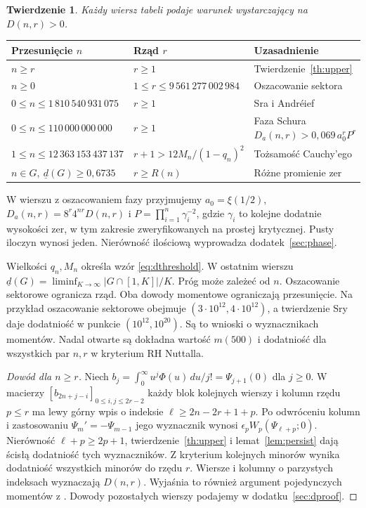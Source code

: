 \documentclass[11pt,a4paper,reqno]{amsart}
\newtheorem{theorem}{Twierdzenie}[section]
\numberwithin{equation}{section}
\begin{document}
\begin{theorem}\label{th:regions}
Każdy wiersz tabeli podaje warunek wystarczający na \(D(n,r)>0\).
\end{theorem}
\begin{center}\small
\begin{tabular}{@{}lll@{}}
\toprule
Przesunięcie \(n\) & Rząd \(r\) & Uzasadnienie\\
\midrule
\(n\ge r\) & \(r\ge1\) & Twierdzenie~\ref{th:upper}\\
\(n\ge0\) & \(1\le r\le9\,561\,277\,002\,984\) & Oszacowanie sektora\\
\(0\le n\le1\,810\,540\,931\,075\) & \(r\ge1\) & Sra i Andréief\\
\(0\le n\le110\,000\,000\,000\) & \(r\ge1\) & \shortstack[l]{Faza Schura\\[2pt]\(D_a(n,r)>0{,}069\,a_0^rP^r\)}\\
\(1\le n\le12\,363\,153\,437\,137\) & \(r+1>12M_n/(1-q_n)^2\) & Tożsamość Cauchy'ego\\
\(n\in G,\ \underline d(G)\ge0{,}6735\) & \(r\ge R(n)\) & Różne promienie zer\\
\bottomrule
\end{tabular}
\end{center}
W wierszu z oszacowaniem fazy przyjmujemy \(a_0=\xi(1/2)\), \(D_a(n,r)=8^r4^{nr}D(n,r)\) i \(P=\prod_{i=1}^n\gamma_i^{-2}\), gdzie \(\gamma_i\) to kolejne dodatnie wysokości zer, w tym zakresie zweryfikowanych na prostej krytycznej. Pusty iloczyn wynosi jeden. Nierówność ilościową wyprowadza dodatek~\ref{sec:phase}.

Wielkości \(q_n,M_n\) określa wzór \eqref{eq:dthreshold}. W ostatnim wierszu \(\underline d(G)=\liminf_{K\to\infty}|G\cap[1,K]|/K\). Próg może zależeć od \(n\). Oszacowanie sektorowe ogranicza rząd. Oba dowody momentowe ograniczają przesunięcie. Na przykład oszacowanie sektorowe obejmuje \((3\cdot10^{12},4\cdot10^{12})\), a twierdzenie Sry daje dodatniość w punkcie \((10^{12},10^{20})\). Są to wnioski o wyznacznikach momentów. Nadal otwarte są dokładna wartość \(m(500)\) i dodatniość dla wszystkich par \(n,r\) w kryterium RH Nuttalla.

\begin{proof}[Dowód dla \(n\ge r\)]
Niech \(b_j=\int_0^\infty u^j\Phi(u)\,du/j!=\Psi_{j+1}(0)\) dla \(j\ge0\). W macierzy \([b_{2n+j-i}]_{0\le i,j\le2r-2}\) każdy blok kolejnych wierszy i kolumn rzędu \(p\le r\) ma lewy górny wpis o indeksie \(\ell\ge2n-2r+1+p\). Po odwróceniu kolumn i zastosowaniu \(\Psi_m'=-\Psi_{m-1}\) jego wyznacznik wynosi \(\epsilon_p W_p(\Psi_{\ell+p};0)\). Nierówność \(\ell+p\ge2p+1\), twierdzenie~\ref{th:upper} i lemat~\ref{lem:persist} dają ścisłą dodatniość tych wyznaczników. Z kryterium kolejnych minorów \cite[lemat~2.4]{fjs} wynika dodatniość wszystkich minorów do rzędu \(r\). Wiersze i kolumny o parzystych indeksach wyznaczają \(D(n,r)\). Wyjaśnia to również argument pojedynczych momentów z \cite[(3.21)--(3.23)]{moment}. Dowody pozostałych wierszy podajemy w dodatku~\ref{sec:dproof}.
\end{proof}
\end{document}
